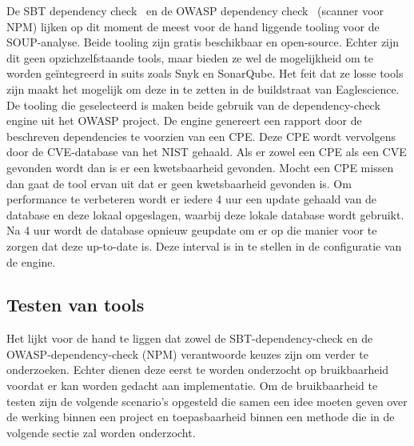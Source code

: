 De SBT dependency check~\citep{Albuch:z.d.} en de OWASP dependency check~\citep{etnera:z.d.} (scanner voor NPM) lijken op dit moment de meest voor de hand liggende tooling voor de SOUP-analyse. Beide tooling zijn gratis beschikbaar en open-source. Echter zijn dit geen opzichzelfstaande tools, maar bieden ze wel de mogelijkheid om te worden geïntegreerd in suits zoals Snyk en SonarQube. Het feit dat ze losse tools zijn maakt het mogelijk om deze in te zetten in de buildstraat van Eaglescience. De tooling die geselecteerd is maken beide gebruik van de dependency-check engine uit het OWASP project.
De engine genereert een rapport door de beschreven dependencies te voorzien van een CPE. Deze CPE wordt vervolgens door de CVE-database van het NIST gehaald. Als er zowel een CPE als een CVE gevonden wordt dan is er een kwetsbaarheid gevonden. Mocht een CPE missen dan gaat de tool ervan uit dat er geen kwetsbaarheid gevonden is. Om performance te verbeteren wordt er iedere 4 uur een update gehaald van de database en deze lokaal opgeslagen, waarbij deze lokale database wordt gebruikt. Na 4 uur wordt de database opnieuw geupdate om er op die manier voor te zorgen dat deze up-to-date is. Deze interval is in te stellen in de configuratie van de engine.

%
%

\subsection{Testen van tools}\label{subsec:testen-van-tools}

Het lijkt voor de hand te liggen dat zowel de SBT-dependency-check en de OWASP-dependency-check (NPM) verantwoorde keuzes zijn om verder te onderzoeken. Echter dienen deze eerst te worden onderzocht op bruikbaarheid voordat er kan worden gedacht aan implementatie. Om de bruikbaarheid te testen zijn de volgende scenario's opgesteld die samen een idee moeten geven over de werking binnen een project en toepasbaarheid binnen een methode die in de volgende sectie zal worden onderzocht.

